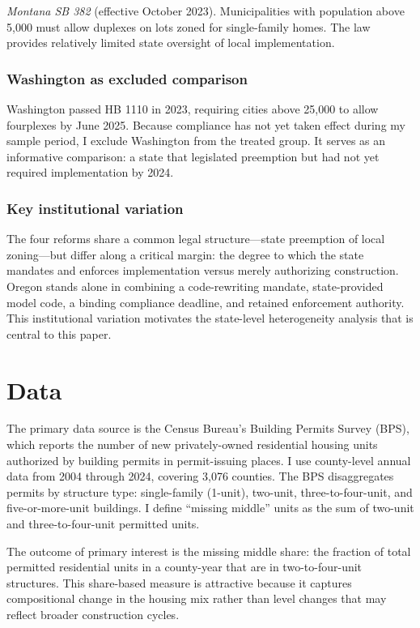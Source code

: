 \documentclass[12pt]{article}
\begin{document}
\textit{Montana SB 382} (effective October 2023). Municipalities with population above 5,000 must allow duplexes on lots zoned for single-family homes. The law provides relatively limited state oversight of local implementation.

\subsubsection*{Washington as excluded comparison} Washington passed HB 1110 in 2023, requiring cities above 25,000 to allow fourplexes by June 2025. Because compliance has not yet taken effect during my sample period, I exclude Washington from the treated group. It serves as an informative comparison: a state that legislated preemption but had not yet required implementation by 2024.

\subsubsection*{Key institutional variation} The four reforms share a common legal structure---state preemption of local zoning---but differ along a critical margin: the degree to which the state mandates and enforces implementation versus merely authorizing construction. Oregon stands alone in combining a code-rewriting mandate, state-provided model code, a binding compliance deadline, and retained enforcement authority. This institutional variation motivates the state-level heterogeneity analysis that is central to this paper.


\section{Data}
\label{sec:data}

The primary data source is the Census Bureau's Building Permits Survey (BPS), which reports the number of new privately-owned residential housing units authorized by building permits in permit-issuing places. I use county-level annual data from 2004 through 2024, covering 3,076 counties. The BPS disaggregates permits by structure type: single-family (1-unit), two-unit, three-to-four-unit, and five-or-more-unit buildings. I define ``missing middle'' units as the sum of two-unit and three-to-four-unit permitted units.

The outcome of primary interest is the missing middle share: the fraction of total permitted residential units in a county-year that are in two-to-four-unit structures. This share-based measure is attractive because it captures compositional change in the housing mix rather than level changes that may reflect broader construction cycles.
\end{document}

